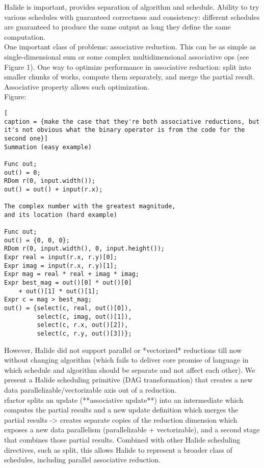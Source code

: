 Halide \cite{Ragan-Kelley:2013:HLC:2491956.2462176} is important, provides separation of algorithm and schedule. Ability to try various schedules with guaranteed correctness and consistency: different schedules are guaranteed to produce the same output as long they define the same computation. \\

One important class of problems: associative reduction. This can be as simple as single-dimensional sum or some complex multidimensional associative ops (see Figure 1). One way to optimize performance in associative reduction: split into smaller chunks of works, compute them separately, and merge the partial result. Associative property allows such optimization. \\

Figure:

\begin{lstlisting}[
caption = {make the case that they're both associative reductions, but it's not obvious what the binary operator is from the code for the second one}]
Summation (easy example)

Func out;
out() = 0;
RDom r(0, input.width());
out() = out() + input(r.x);

The complex number with the greatest magnitude, 
and its location (hard example)

Func out;
out() = {0, 0, 0};
RDom r(0, input.width(), 0, input.height());
Expr real = input(r.x, r.y)[0];
Expr imag = input(r.x, r.y)[1];
Expr mag = real * real + imag * imag;
Expr best_mag = out()[0] * out()[0] 
	+ out()[1] * out()[1];
Expr c = mag > best_mag;
out() = {select(c, real, out()[0]),
         select(c, imag, out()[1]),
         select(c, r.x, out()[2]),
         select(c, r.y, out()[3])};
\end{lstlisting}

However, Halide did not support parallel or *vectorized* reductions till now without changing algorithm (which fails to deliver core promise of language in which schedule and algorithm should be separate and not affect each other). We present a Halide scheduling primitive (DAG transformation) that creates a new data parallelizable/vectorizable axis out of a reduction. \\

rfactor splits an update (**associative update**) into an intermediate which computes the partial results and a new update definition which merges the partial results -> creates separate copies of the reduction dimension which exposes a new data parallelism (parallelizable + vectorizable), and a second stage that combines those partial results. Combined with other Halide scheduling directives, such as split, this allows Halide to represent a broader class of schedules, including parallel associative reduction. 

